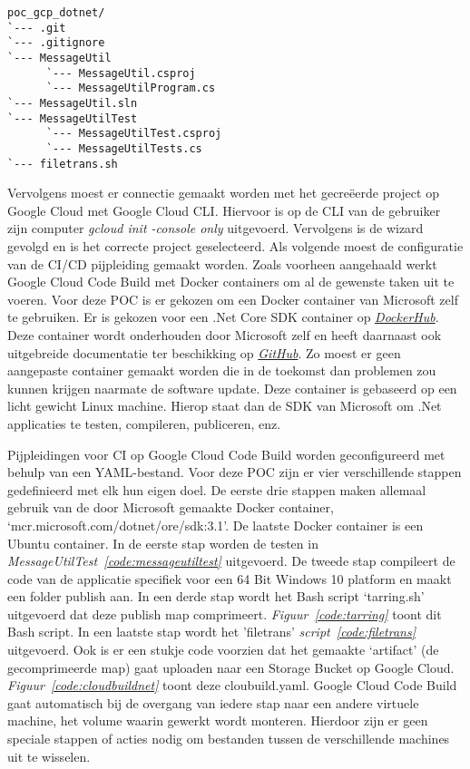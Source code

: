 \begin{lstlisting}
poc_gcp_dotnet/
`--- .git
`--- .gitignore
`--- MessageUtil
      `--- MessageUtil.csproj
      `--- MessageUtilProgram.cs
`--- MessageUtil.sln
`--- MessageUtilTest
      `--- MessageUtilTest.csproj
      `--- MessageUtilTests.cs
`--- filetrans.sh
\end{lstlisting}

Vervolgens moest er connectie gemaakt worden met het gecreëerde project op Google Cloud met Google Cloud CLI. Hiervoor is op de CLI van de gebruiker zijn computer \emph{gcloud init -console only} uitgevoerd. Vervolgens is de wizard gevolgd en is het correcte project geselecteerd. Als volgende moest de configuratie van de CI/CD pijpleiding gemaakt worden. Zoals voorheen aangehaald werkt Google Cloud Code Build met Docker containers om al de gewenste taken uit te voeren. Voor deze POC is er gekozen om een Docker container van Microsoft zelf te gebruiken. Er is gekozen voor een .Net Core SDK container op \emph{\href{https://hub.docker.com/_/microsoft-dotnet-core-sdk}{DockerHub}}. Deze container wordt onderhouden door Microsoft zelf en heeft daarnaast ook uitgebreide documentatie ter beschikking op \emph{\href{https://github.com/dotnet/dotnet-docker/blob/master/samples/README.md}{GitHub}}. Zo moest er geen aangepaste container gemaakt worden die in de toekomst dan problemen zou kunnen krijgen naarmate de software update. Deze container is gebaseerd op een licht gewicht Linux machine. Hierop staat dan de SDK van Microsoft om .Net applicaties te testen, compileren, publiceren, enz.

Pijpleidingen voor CI op Google Cloud Code Build worden geconfigureerd met behulp van een YAML-bestand. Voor deze POC zijn er vier verschillende stappen gedefinieerd met elk hun eigen doel. De eerste drie stappen maken allemaal gebruik van de door Microsoft gemaakte Docker container, ‘mcr.microsoft.com/dotnet/ore/sdk:3.1’. De laatste Docker container is een Ubuntu container. In de eerste stap worden de testen in \emph{MessageUtilTest~\ref{code:messageutiltest}} uitgevoerd. De tweede stap compileert de code van de applicatie specifiek voor een 64 Bit Windows 10 platform en maakt een folder publish aan. In een derde stap wordt het Bash script ‘tarring.sh’ uitgevoerd dat deze publish map comprimeert. \emph{Figuur~\ref{code:tarring}} toont dit Bash script. In een laatste stap wordt het 'filetrans' \emph{script~\ref{code:filetrans}} uitgevoerd. Ook is er een stukje code voorzien dat het gemaakte ‘artifact’ (de gecomprimeerde map) gaat uploaden naar een Storage Bucket op Google Cloud. \emph{Figuur~\ref{code:cloudbuildnet}} toont deze cloubuild.yaml. Google Cloud Code Build gaat automatisch bij de overgang van iedere stap naar een andere virtuele machine, het volume waarin gewerkt wordt monteren. Hierdoor zijn er geen speciale stappen of acties nodig om bestanden tussen de verschillende machines uit te wisselen.

